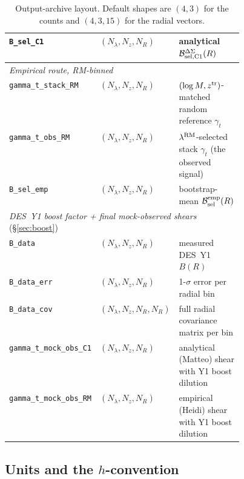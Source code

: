 \documentclass[a4paper, 11pt]{article}
\newcommand{\lrm}{\lambda^{\rm RM}}
\newcommand{\ztr}{z^{\rm tr}}
\newcommand{\Bsel}{\mathcal{B}_{\rm sel}}
\newcommand{\Bcal}{\mathcal{B}}
\newcommand{\blk}[1]{\textcolor{datablockcol}{\texttt{#1}}}
\begin{document}
\begin{table}[H]
\begin{tabular}{@{}l l p{0.45\linewidth}@{}}
\blk{B\_sel\_C1}           & $(N_\lambda, N_z, N_R)$ & analytical $\Bcal_{\rm sel,C1}^{\Delta\Sigma}(R)$ \\
\midrule
\multicolumn{3}{l}{\textit{Empirical route, RM-binned}}                                         \\
\blk{gamma\_t\_stack\_RM}  & $(N_\lambda, N_z, N_R)$ & $(\log M, \ztr)$-matched random reference $\gamma_t$ \\
\blk{gamma\_t\_obs\_RM}    & $(N_\lambda, N_z, N_R)$ & $\lrm$-selected stack $\gamma_t$ (the observed signal) \\
\blk{B\_sel\_emp}          & $(N_\lambda, N_z, N_R)$ & bootstrap-mean $\Bsel^{\rm emp}(R)$ \\
\midrule
\multicolumn{3}{l}{\textit{DES~Y1 boost factor + final mock-observed shears} (\S\ref{sec:boost})} \\
\blk{B\_data}                & $(N_\lambda, N_z, N_R)$ & measured DES~Y1 $B(R)$ \\
\blk{B\_data\_err}           & $(N_\lambda, N_z, N_R)$ & 1-$\sigma$ error per radial bin \\
\blk{B\_data\_cov}           & $(N_\lambda, N_z, N_R, N_R)$ & full radial covariance matrix per bin \\
\blk{gamma\_t\_mock\_obs\_C1} & $(N_\lambda, N_z, N_R)$ & analytical (Matteo) shear with Y1 boost dilution \\
\blk{gamma\_t\_mock\_obs\_RM} & $(N_\lambda, N_z, N_R)$ & empirical (Heidi) shear with Y1 boost dilution \\
\bottomrule
\end{tabular}
\caption{Output-archive layout. Default shapes are $(4, 3)$ for the
counts and $(4, 3, 15)$ for the radial vectors.}
\label{tab:archive}
\end{table}

\subsection{Units and the $h$-convention}
\label{sec:units}
\end{document}
